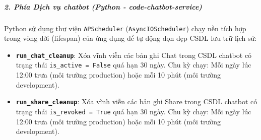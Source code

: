 \subparagraph{2. Phía Dịch vụ chatbot (Python - code-chatbot-service)}
Python sử dụng thư viện \texttt{APScheduler} (\texttt{AsyncIOScheduler}) chạy nền tích hợp trong vòng đời (lifespan) của ứng dụng để tự động dọn dẹp CSDL lưu trữ lịch sử:
\begin{itemize}
\item \textbf{\texttt{run\_chat\_cleanup}}: Xóa vĩnh viễn các bản ghi Chat trong CSDL chatbot có trạng thái \texttt{is\_active = False} quá hạn 30 ngày. Chu kỳ chạy: Mỗi ngày lúc 12:00 trưa (môi trường production) hoặc mỗi 10 phút (môi trường development).
\item \textbf{\texttt{run\_share\_cleanup}}: Xóa vĩnh viễn các bản ghi Share trong CSDL chatbot có trạng thái \texttt{is\_revoked = True} quá hạn 30 ngày. Chu kỳ chạy: Mỗi ngày lúc 12:00 trưa (môi trường production) hoặc mỗi 10 phút (môi trường development).
\end{itemize}
